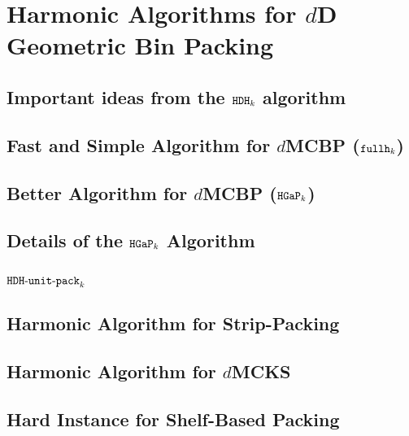 \chapter{Harmonic Algorithms for \texorpdfstring{$d$}{d}D Geometric Bin Packing}
\label{chap:hdhk}

\section{Important ideas from the \texorpdfstring{$\operatorname{\mathtt{HDH}}_{k}$}{HDH} algorithm}
\label{sec:hdhk-prelims}

\section{Fast and Simple Algorithm for \texorpdfstring{$d$}{d}MCBP
(\texorpdfstring{$\operatorname{\mathtt{fullh}}_k$}{fullh\_k})}
\label{sec:fhk}

\section{Better Algorithm for \texorpdfstring{$d$}{d}MCBP
(\texorpdfstring{$\operatorname{\mathtt{HGaP}}_k$}{HGaP\_k})}
\label{sec:hgap}

\section{Details of the \texorpdfstring{$\operatorname{\mathtt{HGaP}}_k$}{HGaP} Algorithm}
\label{sec:hgap-extra}

\section{\texorpdfstring{$\operatorname{\mathtt{HDH-unit-pack}}_k$}{HDH-unit-pack}}
\label{sec:hdhkunit}

\section{Harmonic Algorithm for Strip-Packing}
\label{sec:hdhk-sp}

\section{Harmonic Algorithm for \texorpdfstring{$d$}{d}MCKS}
\label{sec:hdhks}

\begin{optional}
\section{Hard Instance for Shelf-Based Packing}
\label{sec:hard-example}
\end{optional}

